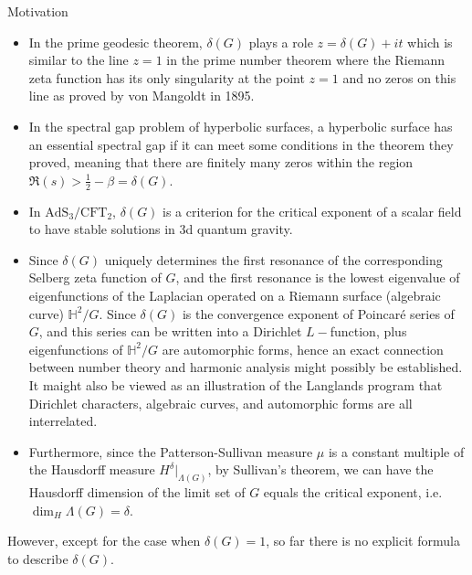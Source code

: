 \documentclass[final]{beamer}
\newlength{\onecolwid}
\begin{document}
\begin{frame}[t]
\begin{columns}[t]
\begin{column}{\onecolwid}
\begin{block}{Motivation}
\begin{small}
\end{small}
\begin{small}
\begin{itemize}
\item In the prime geodesic theorem\cite{borthwick2007spectral}, $\delta(G)$ plays a role $z = \delta(G) + it$ which is similar to the line $z=1$ in the prime number theorem where the Riemann zeta function has its only singularity at the point $z = 1$ and no zeros on this line as proved by von Mangoldt in 1895.
\item In the spectral gap problem of hyperbolic surfaces\cite{bourgain2018spectral}, a hyperbolic surface has an essential spectral gap if it can meet some conditions in the theorem they proved, meaning that there are finitely many zeros within the region $\Re(s)>\frac{1}{2}-\beta=\delta(G)$.
\item In $\text{AdS}_3/\text{CFT}_2$\cite{dong2018phase}, $\delta(G)$ is a criterion for the critical exponent of a scalar field to have stable solutions in 3d quantum gravity. 
\item Since $\delta(G)$ uniquely determines the first resonance of the corresponding Selberg zeta function of $G$, and the first resonance is the lowest eigenvalue of eigenfunctions of the Laplacian operated on a Riemann surface (algebraic curve) $\mathbb{H}^2/G$. Since $\delta(G)$ is the convergence exponent of Poincar\'{e} series of $G$, and this series can be written into a Dirichlet $L-$function, plus eigenfunctions of $\mathbb{H}^2/G$ are automorphic forms, hence an exact connection between number theory and harmonic analysis might possibly be established. It maight also be viewed as an illustration of the Langlands program that Dirichlet characters, algebraic curves, and automorphic forms are all interrelated\cite{bump2003introduction,knapp2009first,knapp2009prerequisites,mueller2021genesis}.
\item Furthermore, since the Patterson-Sullivan measure $\mu$ is a constant multiple of the Hausdorff measure $H^{\delta}\vert_{\Lambda(G)}$, by Sullivan's theorem, we can have the Hausdorff dimension of the limit set of $G$ equals the critical exponent, i.e. $\dim_H\Lambda(G)=\delta$\cite{sullivan1984entropy}.
\end{itemize}
\end{small}

{\small However, except for the case when $\delta(G)=1$, so far there is no explicit formula to describe $\delta(G)$.}
\end{block}


\end{column}
\end{columns}
\end{frame}
\end{document}

